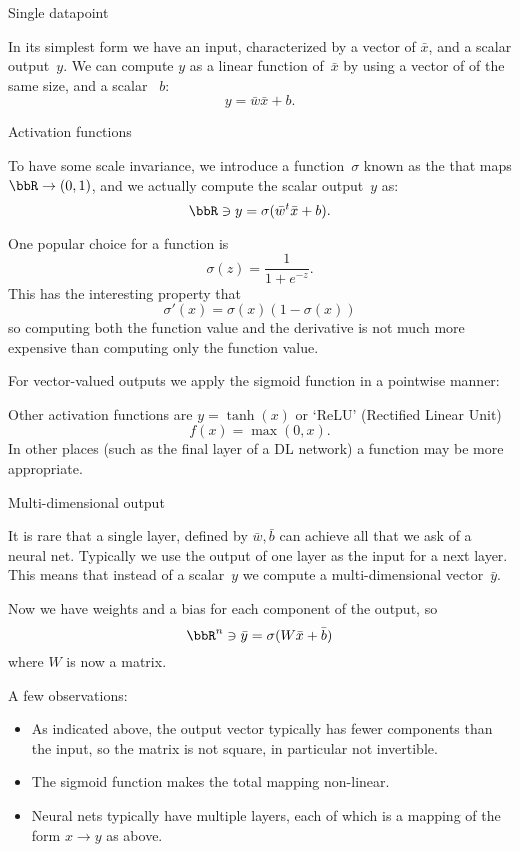  {Single datapoint}

In its simplest form we have an input, characterized by a vector of
$\bar x$, and a scalar output~$y$.  We can
compute $y$ as a linear function of~$\bar x$ by using a vector of
 of the same size, and a scalar
~$b$:
\[  y = \bar w \bar x +b. \]

 {Activation functions}

To have some scale invariance, we introduce 
a function~$\sigma$ known as the
 that maps $\bbR\rightarrow(0,1)$,
and we actually compute the scalar output~$y$ as:
\begin{equation}
  \bbR\owns y = \sigma( \bar w^t\bar x+b ).
\end{equation}

One popular choice for a  function is
\[ \sigma(z) = \frac{1}{1+e^{-z}}. \]
This has the interesting property that
\[ \sigma'(x) = \sigma(x)(1-\sigma(x)) \]
so computing both the function value and the derivative
is not much more expensive than computing only the function value.

For vector-valued outputs we apply the sigmoid function
in a pointwise manner:
%

Other activation functions are $y=\tanh(x)$ or
`ReLU'  (Rectified Linear Unit)
\[ f(x) = \max(0,x). \]
In other places (such as the final layer of a \ac{DL} network)
a  function may be more appropriate.


 {Multi-dimensional output}

It is rare that a single layer, defined by $\bar w,\bar b$
can achieve all that we ask of a neural net.
Typically we use the output of one layer as the input for a next layer.
This means that instead of a scalar~$y$ we compute a multi-dimensional
vector~$\bar y$.

Now we have weights and a bias for each component of the output, so
\[ \bbR^n\owns \bar y = \sigma( W\bar x + \bar b ) \]
where $W$ is now a matrix.

A few observations:
\begin{itemize}
\item
  As indicated above, the output vector typically has fewer components
  than the input, so the matrix is not square, in particular not
  invertible.
\item The sigmoid function makes the total mapping non-linear.
\item Neural nets typically have multiple layers, each of which is a
  mapping of the form $x\rightarrow y$ as above.
\end{itemize}

